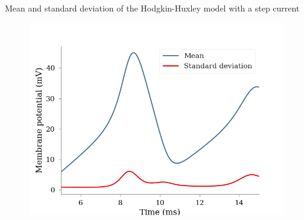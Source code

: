 \documentclass[presentation]{beamer}
\begin{document}




\begin{frame}{Mean and standard deviation of the Hodgkin-Huxley model with a step current}
  \vspace{-5mm}
  \begin{figure}
    \includegraphics[width=1\textwidth]{hh_mean.png}
  \end{figure}

\end{frame}


\end{document}

